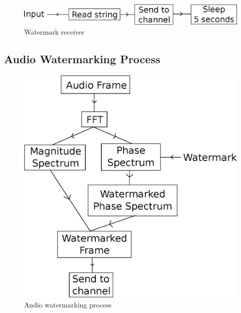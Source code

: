\begin{figure}[bt]
\center
\includegraphics[width=.9\columnwidth]{inputprocess.eps}
\caption{Watermark receiver}
\label{fig:InputProcess}
\end{figure}

\subsection{Audio Watermarking Process}
\begin{figure}[bt]
\center
\includegraphics[width=.9\columnwidth]{watermarkingprocess.eps}
\caption{Audio watermarking process}
\label{fig:WatermarkingProcess}
\end{figure}
